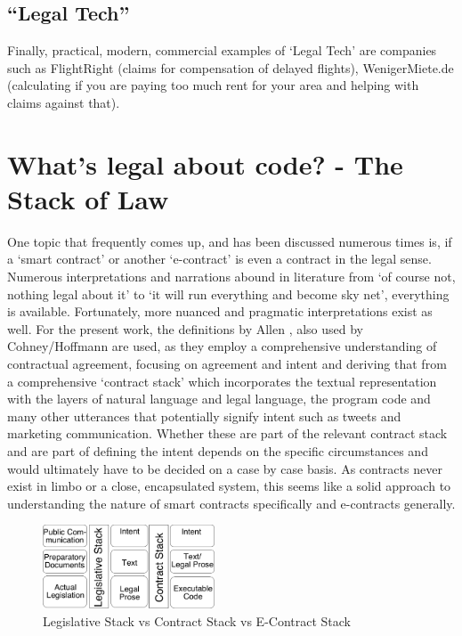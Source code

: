 \documentclass[conference]{IEEEtran}
\begin{document}
\subsection{“Legal Tech”}
Finally, practical, modern, commercial examples of ‘Legal Tech’ are companies such as FlightRight  (claims for compensation of delayed flights), WenigerMiete.de  (calculating if you are paying too much rent for your area and helping with claims against that). \cite{ambrogiGoldenAgeLegal2017}

\section{What’s legal about code? - The Stack of Law}

One topic that frequently comes up, and has been discussed numerous times is, if a ‘smart contract’ or another ‘e-contract’  is even a contract in the legal sense. Numerous interpretations and narrations abound in literature from ‘of course not, nothing legal about it’ to ‘it will run everything and become sky net’, everything is available. Fortunately, more nuanced and pragmatic interpretations exist as well.
For the present work, the definitions by Allen \cite{allenWrappedStackedSmart2018}, also used by Cohney/Hoffmann \cite{cohneyTransactionalScriptsContract2020} are used, as they employ a comprehensive understanding of contractual agreement, focusing on agreement and intent and deriving that from a comprehensive ‘contract stack’ which incorporates the textual representation with the layers of natural language and legal language, the program code 
and many other utterances that potentially signify intent such as tweets and marketing communication. Whether these are part of the relevant contract stack and are part of defining the intent depends on the specific circumstances and would ultimately have to be decided on a case by case basis. As contracts never exist in limbo or a close, encapsulated system, this seems like a solid approach to understanding the nature of smart contracts specifically and e-contracts generally. 

\begin{figure}
    \includegraphics[width=0.455\textwidth]{Contract Stack and Legislative Stack.pdf}
    \caption{Legislative Stack vs Contract Stack vs E-Contract Stack}
    \label{fig:contract_stack}
\end{figure}
\end{document}
